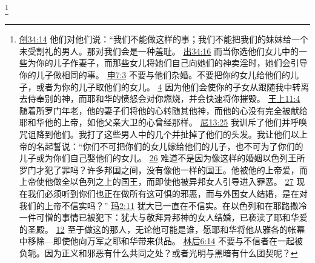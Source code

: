 \documentclass[12pt, a4paper, oneside]{ctexart}
\begin{document}
	\footnote {
		\href{https://biblehub.com/genesis/34-14.htm}{创34:14} 他们对他们说：“我们不能做这样的事；我们不能把我们的妹妹给一个未受割礼的男人。那对我们会是一种羞耻。
		\href{https://biblehub.com/exodus/34-16.htm}{出34:16} 而当你选他们女儿中的一些为你的儿子作妻子，而那些女儿将她们自己向她们的神卖淫时，她们会引导你的儿子做相同的事。
		\href{https://biblehub.com/deuteronomy/7-3.htm}{申7:3} 不要与他们杂婚。不要把你的女儿给他们的儿子，或者为你的儿子取他们的女儿。
		\href{https://biblehub.com/deuteronomy/7-4.htm}{4} 因为他们会使你的子女从跟随我中转离去侍奉别的神，而耶和华的愤怒会对你燃烧，并会快速将你摧毁。
		\href{https://biblehub.com/1_kings/11-4.htm}{王上11:4} 随着所罗门年老，他的妻子们将他的心转随其他神，而他的心没有完全被献给耶和华他的上帝，如他父亲大卫的心曾经那样。
		\href{https://biblehub.com/nehemiah/13-25.htm}{尼13:25} 我训斥了他们并呼唤咒诅降到他们。我打了这些男人中的几个并扯掉了他们的头发。我让他们以上帝的名起誓说：“你们不可把你们的女儿嫁给他们的儿子，也不可为了你们的儿子或为你们自己娶他们的女儿。
		\href{https://biblehub.com/nehemiah/13-26.htm}{26} 难道不是因为像这样的婚姻以色列王所罗门才犯了罪吗？许多邦国之间，没有像他一样的国王。他被他的上帝爱，而上帝使他做全以色列之上的国王，而即使他被异邦女人引导进入罪恶。
		\href{https://biblehub.com/nehemiah/13-27.htm}{27} 现在我们必须听到你们也正在做所有这可惧的邪恶，而与外国女人结婚，是在对我们的上帝不信实吗？”
		\href{https://biblehub.com/malachi/2-11.htm}{玛2:11} 犹大已一直在不信实。在以色列和在耶路撒冷一件可憎的事情已被犯下：犹大与敬拜异邦神的女人结婚，已亵渎了耶和华爱的圣殿。
		\href{https://biblehub.com/malachi/2-12.htm}{12} 至于做这的那人，无论他可能是谁，愿耶和华将他从雅各的帐幕中移除---即使他向万军之耶和华带来供品。
		\href{https://biblehub.com/2_corinthians/6-14.htm}{林后6:14} 不要与不信者在一起被负轭。因为正义和邪恶有什么共同之处？或者光明与黑暗有什么团契呢？
	}
\end{document}

